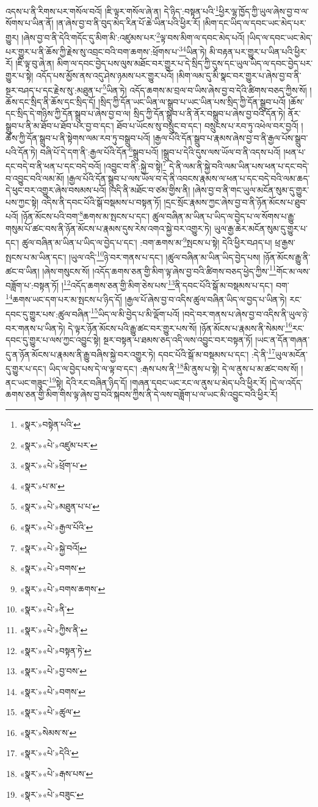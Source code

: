 འདས་པ་ནི་རིགས་པར་གསོལ་བའོ། །ཇི་ལྟར་གསོལ་ཞེ་ན། དེ་ཉིད་:བསྟན་པའི་\footnote{«སྣར་»བསྟེན་པའི་}ཕྱིར་ལྷ་ཁྱོད་ཀྱི་ཡུལ་ཞེས་བྱ་བ་ལ་སོགས་པ་ཡིན་ནོ། །ན་ཞེས་བྱ་བ་ནི་བུད་མེད་རིན་པོ་ཆེ་ཡིན་པའི་ཕྱིར་རོ། །མིག་དང་ཡིད་ལ་དབང་ཡང་མེད་པར་གྱུར། །ཞེས་བྱ་བ་ནི་དེའི་གདོང་དུ་མིག་མི་:འཛུམས་པར་\footnote{«སྣར་»«པེ་»འཛུམ་པར་}ལྟ་བས་མིག་ལ་དབང་མེད་པའོ། །ཡིད་ལ་དབང་ཡང་མེད་པར་གྱུར་པ་ནི་ཆོས་ཀྱི་རྗེས་སུ་འབྲང་བའི་བག་ཆགས་:ཕྲོགས་པ་\footnote{«སྣར་»«པེ་»ཕྲོག་པ་}\footnote{«སྣར་»པ་མ་}ཡིན་ཏེ། མི་བརྟན་པར་གྱུར་པ་ཡིན་པའི་ཕྱིར་རོ། །ཇི་ལྟ་བུ་ཞེ་ན། མིག་ལ་དབང་བྱེད་པས་ལུས་མཐོང་བར་གྱུར་པ་དེ་སྲིད་ཀྱི་དུས་དང་ཡུལ་ཡིད་ལ་དབང་བྱེད་པར་གྱུར་པ་སྟེ། འདོད་པས་མྱོས་ནས་འདུ་ཤེས་ཉམས་པར་གྱུར་པའོ། །མིག་ལམ་དུ་མི་སྣང་བར་གྱུར་པ་ཞེས་བྱ་བ་ནི་སྔར་བཤད་པ་དང་རྗེས་སུ་:མཐུན་པ་\footnote{«སྣར་»«པེ་»མཐུན་པ་པ་}ཡིན་ཏེ། འདོད་ཆགས་མ་བྲལ་བ་ཡིས་ཞེས་བྱ་བ་དེའི་ཚིགས་བཅད་ཀྱིས་སོ། །ཆོས་དང་སྲིད་ནི་ཆོས་དང་སྲིད་དོ། །སྲིད་ཀྱི་དོན་ཡང་ཡིན་ལ་སྒྲུབ་པ་ཡང་ཡིན་པས་སྲིད་ཀྱི་དོན་སྒྲུབ་པའོ། །ཆོས་དང་སྲིད་དེ་གཉིས་ཀྱི་དོན་སྒྲུབ་པ་ཞེས་བྱ་བ་ལ། སྲིད་ཀྱི་དོན་སྒྲུབ་པ་ནི་ནོར་བསྒྲུབ་པ་ཞེས་བྱ་བའི་དོན་ཏེ། ནོར་སྒྲུབ་པ་ནི་མ་ཐོབ་པ་ཐོབ་པར་བྱ་བ་དང་། ཐོབ་པ་ཡོངས་སུ་བསྲུང་བ་དང་། བསྲུངས་པ་རབ་ཏུ་འཕེལ་བར་བྱའོ། །ཆོས་ཀྱི་དོན་སྒྲུབ་པ་ནི་སྟེགས་ལམ་རབ་ཏུ་བསྒྲུབ་པའོ། །རྒྱལ་པོའི་དོན་སྒྲུབ་པ་རྣམས་ཞེས་བྱ་བ་ནི་རྒྱལ་པོས་སྒྲུབ་པའི་དོན་ཏེ། བཞི་པོ་དེ་དག་ནི་:རྒྱལ་པོའི་དོན་\footnote{«སྣར་»«པེ་»རྒྱལ་པོའི་}སྒྲུབ་པའོ། །སྒྲུབ་པ་དེའི་དུས་ལས་ཡོལ་བ་ནི་འདས་པའོ། །ཕན་པ་དང་བདེ་བ་ནི་ཕན་པ་དང་བདེ་བའོ། །འབྱུང་བ་ནི་:སྐྱེ་བ་སྟེ།\footnote{«སྣར་»«པེ་»སྐྱེ་བའོ།} དེ་ནི་ལམ་ནི་སྐྱེ་བའི་ལམ་ཡིན་པས་ཕན་པ་དང་བདེ་བ་འབྱུང་བའི་ལམ་མོ། །རྒྱལ་པོའི་དོན་སྒྲུབ་པ་ལས་ཡོལ་བ་དེ་ནི་འབངས་རྣམས་ལ་ཕན་པ་དང་བདེ་བའི་ལམ་ཆད་དེ་ཕུང་བར་འགྱུར་ཞེས་བསམས་པའོ། །འདི་ནི་མཐོང་བ་ཙམ་གྱིས་ནི། །ཞེས་བྱ་བ་ནི་གང་ཡུལ་མངོན་སུམ་དུ་གྱུར་པས་ཀྱང་སྟེ། འདིས་ནི་དབང་པོའི་སྒོ་བསྡམས་པ་བསྟན་ཏོ། །དྲང་སྲོང་རྣམས་ཀྱང་ཞེས་བྱ་བ་ནི་ཉོན་མོངས་པ་ཐུབ་པའོ། །ཉོན་མོངས་པའི་བག་\footnote{«སྣར་»«པེ་»བགས་}ཆགས་མ་སྤངས་པ་དང་། ཚུལ་བཞིན་མ་ཡིན་པ་ཡིད་ལ་བྱེད་པ་ལ་སོགས་པ་རྒྱུ་གསུམ་པོ་ཚང་བས་ནི་ཉོན་མོངས་པ་རྣམས་དུས་རེས་འགའ་སྐྱེ་བར་འགྱུར་ཏེ། ཡུལ་རྒྱ་ཆེར་མངོན་སུམ་དུ་གྱུར་པ་དང་། ཚུལ་བཞིན་མ་ཡིན་པ་ཡིད་ལ་བྱེད་པ་དང་། :བག་ཆགས་མ་\footnote{«སྣར་»«པེ་»བགས་ཆགས་}སྤངས་པ་སྟེ། དེའི་ཕྱིར་བཤད་པ། ཕྲ་རྒྱས་སྤངས་པ་མ་ཡིན་དང་། །ཡུལ་འདི་\footnote{«སྣར་»«པེ་»ནི་}ཉེ་བར་གནས་པ་དང་། །ཚུལ་བཞིན་མ་ཡིན་ཡིད་བྱེད་པས། །ཉོན་མོངས་རྒྱུ་ནི་ཚང་བ་ཡིན། །ཞེས་གསུངས་སོ། །འདོད་ཆགས་ཅན་གྱི་མིག་ལྟ་ཞེས་བྱ་བའི་ཚིགས་བཅད་ཕྱེད་ཀྱིས་\footnote{«སྣར་»«པེ་»ཀྱིས་ནི་}གོང་མ་ལས་བཟློག་པ་:བསྟན་ཏོ། །\footnote{«སྣར་»«པེ་»བསྟན་ཏེ་}འདོད་ཆགས་ཅན་གྱི་མིག་ཅེས་པས་\footnote{«སྣར་»«པེ་»བྱ་བས་}ནི་དབང་པོའི་སྒོ་མ་བསྡམས་པ་དང་། བག་\footnote{«སྣར་»«པེ་»བགས་}ཆགས་ཡང་དག་པར་མ་སྤངས་པ་ཉིད་དོ། །རྒྱལ་པོ་ཞེས་བྱ་བ་འདིས་ཚུལ་བཞིན་ཡིད་ལ་བྱད་པ་ཡིན་ཏེ། རང་དབང་དུ་གྱུར་པས་:ཚུལ་བཞིན་\footnote{«སྣར་»«པེ་»ཚུལ་}ཡིད་ལ་མི་བྱེད་པ་མི་ལྡོག་པའོ། །བདེ་བར་གནས་པ་ཞེས་བྱ་བ་འདིས་ནི་ཡུལ་ཉེ་བར་གནས་པ་ཡིན་ཏེ། དེ་ལྟར་ཉོན་མོངས་པའི་རྒྱུ་ཚང་བར་གྱུར་པས་སོ། །ཉོན་མོངས་པ་རྣམས་ནི་སེམས་\footnote{«སྣར་»སེམས་ས་}རང་དབང་དུ་གྱུར་པ་ལས་ཀྱང་འབྱུང་སྟེ། སྔར་བསྟན་པ་ཐམས་ཅད་འདི་ལས་འབྱུང་བར་བསྟན་ཏོ། །ཡང་ན་དོན་གཞན་དུ་ན་ཉོན་མོངས་པ་རྣམས་ནི་རྒྱུ་བཞིས་སྐྱེ་བར་འགྱུར་ཏེ། དབང་པོའི་སྒོ་མ་བསྡམས་པ་དང་། :དེ་ནི་\footnote{«སྣར་»«པེ་»དེའི་}ཡུལ་མངོན་དུ་གྱུར་པ་དང་། ཡིད་ལ་བྱེད་པས་དེ་ལ་ལྟ་བ་དང་། :རྒས་པས་ནི་\footnote{«སྣར་»«པེ་»རྒས་པས་}མི་ནུས་པ་སྟེ། དེ་ལ་ནུས་པ་མ་ཚང་བས་སོ། །ནང་ཡང་གཟུང་\footnote{«སྣར་»«པེ་»བཟུང་}སྟེ། དེའི་རང་བཞིན་ཉིད་དོ། །གཞན་དབང་ཡང་རང་ལ་ནུས་པ་མེད་པའི་ཕྱིར་རོ། །དེ་ལ་འདོད་ཆགས་ཅན་གྱི་མིག་གིས་ལྟ་ཞེས་བྱ་བའི་སྐབས་ཀྱིས་ནི་དེ་ལས་བཟློག་པ་ལ་ཡང་མི་འབྱུང་བའི་ཕྱིར་རོ། 
